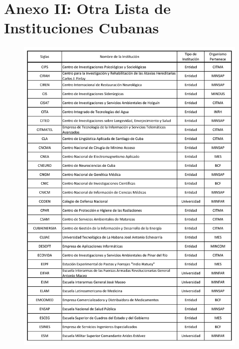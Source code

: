 \chapter{Anexo II: Otra Lista de Instituciones Cubanas}\label{ch:anexo-ii:-otra-de-instituciones-cubanas}
\begin{figure}
    \centering
    \includegraphics[width=\linewidth]{Figure/anexo/3}\label{fig:figure3}
\end{figure}

